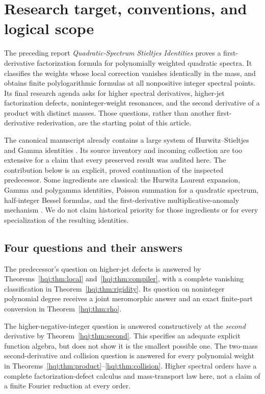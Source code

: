 \section{Research target, conventions, and logical scope}
\label{hqj:sec:scope}

The preceding report \emph{Quadratic-Spectrum Stieltjes Identities}
\cite{predecessor} proves a first-derivative factorization formula for
polynomially weighted quadratic spectra. It classifies the weights whose
local correction vanishes identically in the mass, and obtains finite
polylogarithmic formulas at all nonpositive integer spectral points.
Its final research agenda asks for higher spectral derivatives,
higher-jet factorization defects, noninteger-weight resonances, and the
second derivative of a product with distinct masses. Those questions,
rather than another first-derivative rederivation, are the starting point
of this article.

The canonical manuscript already contains a large system of
Hurwitz--Stieltjes and Gamma identities \cite{repo}. Its source inventory
and incoming collection are too extensive for a claim that every
preserved result was audited here. The contribution below is an explicit,
proved continuation of the inspected predecessor. Some ingredients are
classical: the Hurwitz Laurent expansion, Gamma and polygamma identities,
Poisson summation for a quadratic spectrum, half-integer Bessel formulas,
and the first-derivative multiplicative-anomaly mechanism
\cite{hurwitz,gamma,polygamma,bessel,order,dowker}. We do not claim
historical priority for those ingredients or for every specialization of
the resulting identities.

\subsection{Four questions and their answers}
The predecessor's question on higher-jet defects is answered by
Theorems~\ref{hqj:thm:local} and~\ref{hqj:thm:compiler}, with a complete
vanishing classification in Theorem~\ref{hqj:thm:rigidity}. Its question
on noninteger polynomial degree receives a joint meromorphic answer and
an exact finite-part conversion in Theorem~\ref{hqj:thm:rho}.

The higher-negative-integer question is answered constructively at the
\emph{second} derivative by Theorem~\ref{hqj:thm:second}. This specifies
an adequate explicit function algebra, but does not show it is the
smallest possible one. The two-mass second-derivative and collision
question is answered for every polynomial weight in
Theorems~\ref{hqj:thm:product}--\ref{hqj:thm:collision}. Higher spectral
orders have a complete factorization-defect calculus and mass-transport
law here, not a claim of a finite Fourier reduction at every order.

